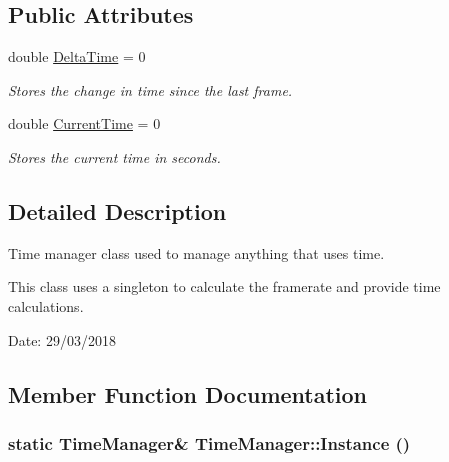 \subsection*{Public Attributes}
\begin{CompactItemize}
\item 
\hypertarget{class_time_manager_29ebf2fa98a175c85dce334edea936e5}{
double \hyperlink{class_time_manager_29ebf2fa98a175c85dce334edea936e5}{DeltaTime} = 0}
\label{class_time_manager_29ebf2fa98a175c85dce334edea936e5}

\begin{CompactList}\small\item\em Stores the change in time since the last frame. \item\end{CompactList}\item 
\hypertarget{class_time_manager_b015656db2574db7be945e10efa94309}{
double \hyperlink{class_time_manager_b015656db2574db7be945e10efa94309}{CurrentTime} = 0}
\label{class_time_manager_b015656db2574db7be945e10efa94309}

\begin{CompactList}\small\item\em Stores the current time in seconds. \item\end{CompactList}\end{CompactItemize}


\subsection{Detailed Description}
Time manager class used to manage anything that uses time. 

This class uses a singleton to calculate the framerate and provide time calculations.

\begin{Desc}
\item[Date:]29/03/2018 \end{Desc}


\subsection{Member Function Documentation}
\hypertarget{class_time_manager_9bb9e5390526b32783b94adb728604fa}{
\subsubsection[Instance]{\setlength{\rightskip}{0pt plus 5cm}static {\bf TimeManager}\& TimeManager::Instance ()}}
\label{class_time_manager_9bb9e5390526b32783b94adb728604fa}


